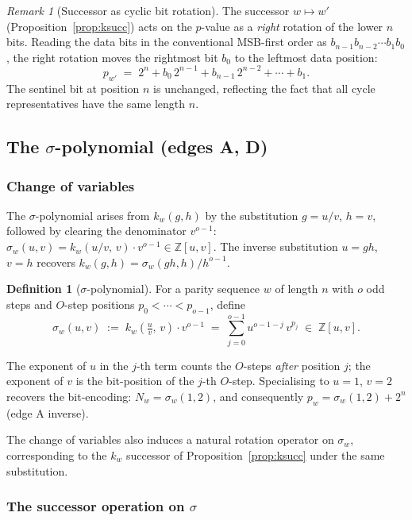 \documentclass[12pt]{article}
\theoremstyle{definition}
\newtheorem{definition}[theorem]{Definition}
\theoremstyle{remark}
\newtheorem{remark}[theorem]{Remark}
\newcommand{\ZZ}{\mathbb{Z}}
\newcommand{\kpoly}{k}
\begin{document}
\begin{remark}[Successor as cyclic bit rotation]
The successor $w \mapsto w'$ (Proposition~\ref{prop:ksucc}) acts on the
$p$-value as a \emph{right} rotation of the lower $n$ bits.  Reading the
data bits in the conventional MSB-first order as $b_{n-1} b_{n-2} \cdots b_1 b_0$,
the right rotation moves the rightmost bit $b_0$ to the leftmost data position:
\[
  p_{w'} \;=\; 2^n + b_0\, 2^{n-1} + b_{n-1}\, 2^{n-2} + \cdots + b_1.
\]
The sentinel bit at position $n$ is unchanged, reflecting the fact that all
cycle representatives have the same length $n$.
\end{remark}

\subsection{The $\sigma$-polynomial (edges A, D)}

\subsubsection*{Change of variables}

The $\sigma$-polynomial arises from $\kpoly_w(g,h)$ by the substitution
$g = u/v$, $h = v$, followed by clearing the denominator $v^{o-1}$:
$\sigma_w(u,v) = \kpoly_w(u/v,\,v)\cdot v^{o-1} \in \ZZ[u,v]$.
The inverse substitution $u = gh$, $v = h$ recovers
$\kpoly_w(g,h) = \sigma_w(gh,h)/h^{o-1}$.

\begin{definition}[$\sigma$-polynomial]
\label{def:sigma}
For a parity sequence $w$ of length $n$ with $o$ odd steps and $O$-step
positions $p_0 < \cdots < p_{o-1}$, define
\[
  \sigma_w(u,v) \;:=\; \kpoly_w\!\left(\tfrac{u}{v},\, v\right) \cdot v^{o-1}
  \;=\; \sum_{j=0}^{o-1} u^{o-1-j}\, v^{p_j}
  \;\in\; \ZZ[u,v].
\]
\end{definition}

The exponent of $u$ in the $j$-th term counts the $O$-steps \emph{after}
position $j$; the exponent of $v$ is the bit-position of the $j$-th $O$-step.
Specialising to $u = 1$, $v = 2$ recovers the bit-encoding: $N_w = \sigma_w(1,2)$,
and consequently $p_w = \sigma_w(1,2) + 2^n$ (edge A inverse).

The change of variables also induces a natural rotation operator on $\sigma_w$,
corresponding to the $\kpoly_w$ successor of Proposition~\ref{prop:ksucc}
under the same substitution.

\subsubsection*{The successor operation on $\sigma$}
\end{document}
